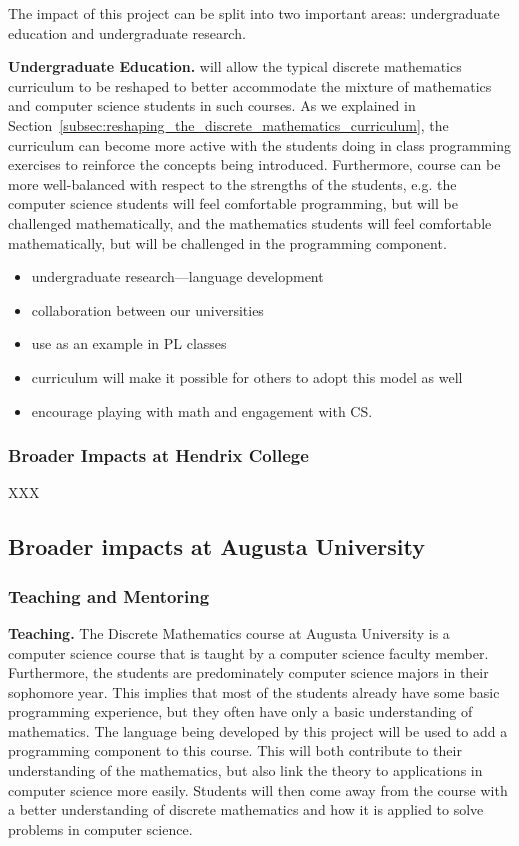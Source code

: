 The impact of this project can be split into two important areas:
undergraduate education and undergraduate research.

\textbf{Undergraduate Education.}  \thelang{} will allow the typical
discrete mathematics curriculum to be reshaped to better accommodate
the mixture of mathematics and computer science students in such
courses.  As we explained in
Section~\ref{subsec:reshaping_the_discrete_mathematics_curriculum},
the curriculum can become more active with the students doing in class
programming exercises to reinforce the concepts being introduced.
Furthermore, course can be more well-balanced with respect to the
strengths of the students, e.g. the computer science students will
feel comfortable programming, but will be challenged mathematically,
and the mathematics students will feel comfortable mathematically, but
will be challenged in the programming component.

\begin{itemize}
\item undergraduate research---language development
\item collaboration between our universities
\item use as an example in PL classes
\item curriculum will make it possible for others to adopt this model
  as well
\item encourage playing with math and engagement with CS.
\end{itemize}

\subsubsection{Broader Impacts at Hendrix College}
\label{subsec:broader_impacts_at_hendrix_college}
XXX

\subsection{Broader impacts at Augusta University}
\label{subsec:broader_impacts_at_augusta_university}

\subsubsection{Teaching and Mentoring}
\label{subsec:teaching_and_mentoring}

\textbf{Teaching.}  The Discrete Mathematics course at Augusta
University is a computer science course that is taught by a computer
science faculty member.  Furthermore, the students are predominately
computer science majors in their sophomore year.  This implies that
most of the students already have some basic programming experience,
but they often have only a basic understanding of mathematics.  The
language being developed by this project will be used to add a
programming component to this course.  This will both contribute to
their understanding of the mathematics, but also link the theory to
applications in computer science more easily.  Students will then come
away from the course with a better understanding of discrete
mathematics and how it is applied to solve problems in computer
science.

